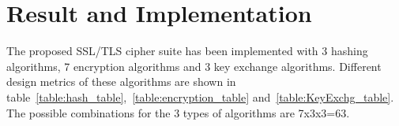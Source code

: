 \documentclass[3p,times]{elsarticle}
\begin{document}
\section{Result and Implementation}
\label{res_impl}
The proposed SSL/TLS cipher suite has been implemented with 3 hashing algorithms, 7 encryption algorithms and 3 key exchange algorithms.  Different design metrics of these algorithms are shown in table~\ref{table:hash_table},~\ref{table:encryption_table} and~\ref{table:KeyExchg_table}. The possible combinations for the 3 types of algorithms are 7x3x3=63.
\begin{table}[!h]
\caption{Onchip resource throughput power of HASH algorithm} \centering  {}
\label{table:hash_table} \end{table}
\begin{table}[!h]
\caption{Onchip resource throughput power of Crypto algorithm} \centering  {}
\label{table:encryption_table} \end{table}
\end{document}
